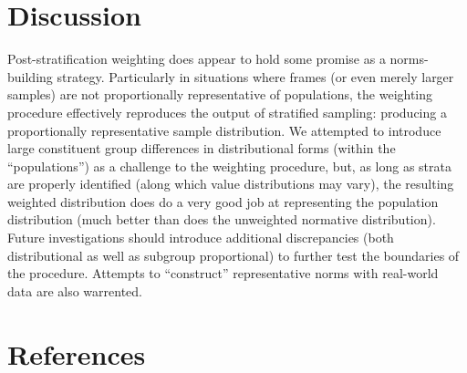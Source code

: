 \documentclass[
  ,man]{apa6}
\begin{document}
\hypertarget{discussion}{%
\section{Discussion}\label{discussion}}

Post-stratification weighting does appear to hold some promise as a norms-building strategy. Particularly in situations where frames (or even merely larger samples) are not proportionally representative of populations, the weighting procedure effectively reproduces the output of stratified sampling: producing a proportionally representative sample distribution. We attempted to introduce large constituent group differences in distributional forms (within the ``populations'') as a challenge to the weighting procedure, but, as long as strata are properly identified (along which value distributions may vary), the resulting weighted distribution does do a very good job at representing the population distribution (much better than does the unweighted normative distribution). Future investigations should introduce additional discrepancies (both distributional as well as subgroup proportional) to further test the boundaries of the procedure. Attempts to ``construct'' representative norms with real-world data are also warrented.

\newpage

\hypertarget{references}{%
\section{References}\label{references}}

\begingroup
\setlength{\parindent}{-0.5in}
\setlength{\leftskip}{0.5in}
\end{document}
